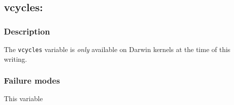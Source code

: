 \clearpage
{}
{}
\label{vars:vcycles}
\subsection*{vcycles: }

\subsubsection*{Description}

The \verb|vcycles| variable is \emph{only} available on Darwin kernels
at the time of this writing.

\subsubsection*{Failure modes}

This variable
